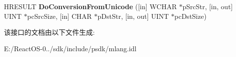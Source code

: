 \begin{DoxyCompactItemize}
\item 
\mbox{\label{interface_multi_language_1_1_i_m_lang_convert_charset_a1e61c4dab20933b08a2fba29dba95630}} 
H\+R\+E\+S\+U\+LT {\bfseries Do\+Conversion\+From\+Unicode} (\mbox{[}in\mbox{]} W\+C\+H\+AR $\ast$p\+Src\+Str, \mbox{[}in, out\mbox{]} U\+I\+NT $\ast$pc\+Src\+Size, \mbox{[}in\mbox{]} C\+H\+AR $\ast$p\+Dst\+Str, \mbox{[}in, out\mbox{]} U\+I\+NT $\ast$pc\+Dst\+Size)
\end{DoxyCompactItemize}


该接口的文档由以下文件生成\+:\begin{DoxyCompactItemize}
\item 
E\+:/\+React\+O\+S-\/0../sdk/include/psdk/mlang.\+idl\end{DoxyCompactItemize}
